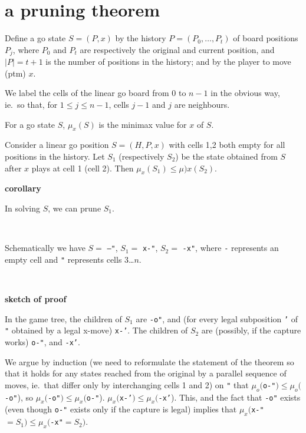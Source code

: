 \section*{a pruning theorem}
Define a go state $S=(P,x)$ by the history $P = (P_0, \ldots, P_t)$
of board positions $P_j$, 
where $P_0$ and $P_t$ 
are respectively the original and current position,
and $|P| = t+1$ is the number of positions in the history;
and by the player to move (ptm) $x$.

We label the cells of the linear go board from 0 to $n-1$
in the obvious way, ie.\ so that,
for $1 \leq j \leq n-1$, cells $j-1$ and $j$ are neighbours.

For a go state $S$, 
$\mu_x(S)$ is the minimax value for $x$ of $S$.

\begin{theorem}
Consider a linear go position $S=(H,P,x)$
with cells 1,2 both empty for all positions in the history.
Let $S_1$ (respectively $S_2$)
be the state obtained from $S$ after $x$ plays at cell 1 (cell 2).
Then $\mu_x(S_1) \leq \mu)x(S_2)$.
\end{theorem}

{\bf corollary}

In solving $S$, we can prune $S_1$.

~

Schematically we have $S=$ {\tt --"}, 
$S_1=$ {\tt x-"}, 
$S_2=$ {\tt -x"},
where {\tt -} represents an empty cell and {\tt "} represents cells 3\ldots$n$.

~

{\bf sketch of proof}

In the game tree, the children of $S_1$ are
{\tt -o"}, and (for every legal subposition {\tt '} of {\tt "} obtained
by a legal x-move) {\tt x-'}.
The children of $S_2$ are
(possibly, if the capture works)
{\tt o-"}, and {\tt -x'}.

We argue by induction 
(we need to reformulate the statement of the theorem so
that it holds for any states reached from the original
by a parallel sequence of moves, ie.\ that differ only
by interchanging cells 1 and 2)
on {\tt "} that
$\mu_o(${\tt o-"}$) \leq \mu_o(${\tt -o"}), so
$\mu_x(${\tt -o"}$) \leq \mu_x(${\tt o-"}).
$\mu_x(${\tt x-'}$) \leq \mu_x(${\tt -x'}).
This, and the fact that {\tt -o"} exists (even though {\tt o-"} exists
only if the capture is legal)
implies that $\mu_x(${\tt x-"}$=S_1) \leq \mu_x(${\tt -x"}$=S_2)$.
\vfill~
